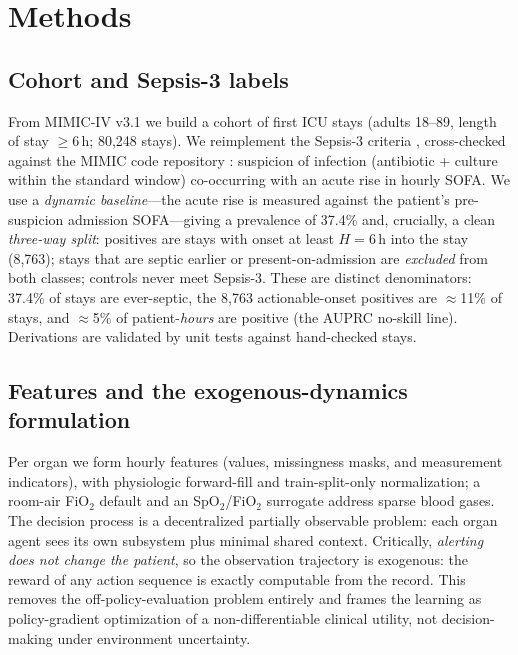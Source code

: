 \documentclass[conference]{IEEEtran}
\begin{document}
\section{Methods}
\subsection{Cohort and Sepsis-3 labels}
From MIMIC-IV v3.1 \cite{johnson2023mimiciv} we build a cohort of first ICU stays
(adults 18--89, length of stay $\geq 6$\,h; 80{,}248 stays). We reimplement the
Sepsis-3 criteria \cite{singer2016sepsis3,seymour2016assessment}, cross-checked
against the MIMIC code repository \cite{johnson2018mimiccode}: suspicion of
infection (antibiotic + culture within the standard window) co-occurring with an
acute rise in hourly SOFA. We use a \emph{dynamic baseline}---the acute rise is
measured against the patient's pre-suspicion admission SOFA---giving a prevalence of
37.4\% and, crucially, a clean \emph{three-way split}: positives are stays with
onset at least $H{=}6$\,h into the stay (8{,}763); stays that are septic earlier or
present-on-admission are \emph{excluded} from both classes; controls never meet
Sepsis-3. These are distinct denominators: 37.4\% of stays are ever-septic, the
8{,}763 actionable-onset positives are $\approx$11\% of stays, and $\approx$5\% of
patient-\emph{hours} are positive (the AUPRC no-skill line). Derivations are validated
by unit tests against hand-checked stays.

\subsection{Features and the exogenous-dynamics formulation}
Per organ we form hourly features (values, missingness masks, and measurement
indicators), with physiologic forward-fill and train-split-only normalization;
a room-air FiO$_2$ default and an SpO$_2$/FiO$_2$ surrogate \cite{rice2007sfratio}
address sparse blood gases. The decision process is a decentralized partially
observable problem: each organ agent sees its own subsystem plus minimal shared
context. Critically, \emph{alerting does not change the patient}, so the observation
trajectory is exogenous: the reward of any action sequence is exactly computable from
the record. This removes the off-policy-evaluation problem entirely and frames the
learning as policy-gradient optimization of a non-differentiable clinical utility,
not decision-making under environment uncertainty.
\end{document}
